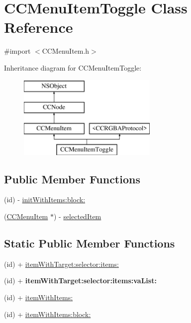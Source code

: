 \hypertarget{interface_c_c_menu_item_toggle}{\section{C\-C\-Menu\-Item\-Toggle Class Reference}
\label{interface_c_c_menu_item_toggle}
}


{\ttfamily \#import $<$C\-C\-Menu\-Item.\-h$>$}

Inheritance diagram for C\-C\-Menu\-Item\-Toggle\-:\begin{figure}[H]
\begin{center}
\leavevmode
\includegraphics[height=4.000000cm]{interface_c_c_menu_item_toggle}
\end{center}
\end{figure}
\subsection*{Public Member Functions}
\begin{DoxyCompactItemize}
\item 
(id) -\/ \hyperlink{interface_c_c_menu_item_toggle_a85d98fa3f4648093652eb6157de30bca}{init\-With\-Items\-:block\-:}
\item 
(\hyperlink{interface_c_c_menu_item}{C\-C\-Menu\-Item} $\ast$) -\/ \hyperlink{interface_c_c_menu_item_toggle_a56f0c8529a3a81afad496cff8d50976d}{selected\-Item}
\end{DoxyCompactItemize}
\subsection*{Static Public Member Functions}
\begin{DoxyCompactItemize}
\item 
(id) + \hyperlink{interface_c_c_menu_item_toggle_aa8b71ffeb6a73420c6de051b70c5744e}{item\-With\-Target\-:selector\-:items\-:}
\item 
\hypertarget{interface_c_c_menu_item_toggle_a3bb29bcad3282e07fb13c2b668a91627}{(id) + {\bfseries item\-With\-Target\-:selector\-:items\-:va\-List\-:}}\label{interface_c_c_menu_item_toggle_a3bb29bcad3282e07fb13c2b668a91627}

\item 
(id) + \hyperlink{interface_c_c_menu_item_toggle_aef6726814d5b39313f35f7387ed57269}{item\-With\-Items\-:}
\item 
(id) + \hyperlink{interface_c_c_menu_item_toggle_a64c39bd7bd649000a54ea0b77bf12588}{item\-With\-Items\-:block\-:}
\end{DoxyCompactItemize}
